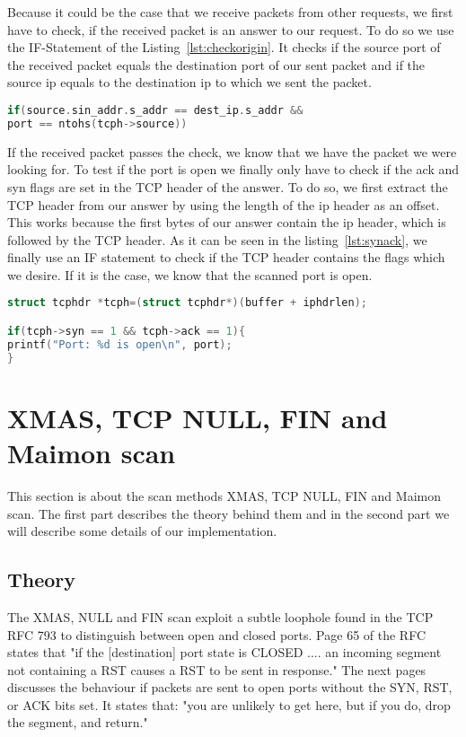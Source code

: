 Because it could be the case that we receive packets from other requests, we first have to check, if the received packet
is an answer to our request. To do so we use the IF-Statement of the Listing~\ref{lst:checkorigin}. It checks if the source port of the received packet equals the destination port of our sent packet and
if the source ip equals to the destination ip to which we sent the packet.
\begin{lstlisting}[frame= single, language=C, caption= IF statement to check origin of packet, label=lst:checkorigin]
if(source.sin_addr.s_addr == dest_ip.s_addr &&
port == ntohs(tcph->source))
\end{lstlisting}
If the received packet passes the check, we know that we have the packet we were looking for. To test if the port is open we finally only have to check if the ack and syn flags are set in the TCP header
of the answer. To do so, we first extract the TCP header from our answer by using the length of the ip header as an offset. This works because the first bytes of our answer contain the ip header, which
is followed by the TCP header. As it can be seen in the listing~\ref{lst:synack}, we finally use an IF statement to check if the TCP header contains the flags which we desire. If it is the case, we know that the scanned
port is open.
\begin{lstlisting}[frame= single, language=C, caption=C code to check if answer contains syn and ack flag, label=lst:synack]
struct tcphdr *tcph=(struct tcphdr*)(buffer + iphdrlen);

if(tcph->syn == 1 && tcph->ack == 1){
printf("Port: %d is open\n", port);
} 
\end{lstlisting}
\section{XMAS, TCP NULL, FIN and Maimon scan}
\label{sec:xmas}
This section is about the scan methods XMAS, TCP NULL, FIN and Maimon scan. The first part describes the theory behind them and in the second part we will describe some details of our implementation.
\subsection{Theory}
The XMAS, NULL and FIN scan exploit a subtle loophole found in the TCP RFC 793 to distinguish between open and closed ports. Page 65 of the RFC states that
"if the [destination] port state is CLOSED .... an incoming segment not containing a RST causes a RST to be sent in response." The next pages discusses the behaviour if packets are sent to open ports
without the SYN, RST, or ACK bits set. It states that: "you are unlikely to get here, but if you do, drop the segment, and return." 



